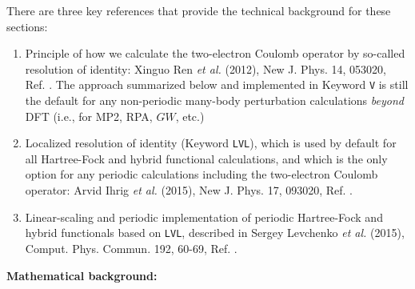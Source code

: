 There are three key references that provide the technical background
for these sections:
\begin{enumerate}
  \item Principle of how we calculate the two-electron Coulomb
    operator by so-called resolution of identity: Xinguo Ren \emph{et
    al.} (2012), New J. Phys. 14, 053020, Ref. \cite{Ren12a}. The
    approach summarized below and implemented in Keyword
     \texttt{V} is still the default for any
    non-periodic many-body perturbation calculations \emph{beyond} DFT
    (i.e., for MP2, RPA, $GW$, etc.)
  \item Localized resolution of identity (Keyword 
    \texttt{LVL}), which is used by default for all Hartree-Fock and
    hybrid functional calculations, and which is the only option for
    any periodic calculations including the two-electron Coulomb
    operator: Arvid Ihrig \emph{et al.} (2015), New J. Phys. 17,
    093020, Ref. \cite{Ihrig2015}.
  \item Linear-scaling and periodic implementation of periodic
    Hartree-Fock and hybrid functionals based on  
    \texttt{LVL}, described in Sergey Levchenko \emph{et al.} (2015),
    Comput. Phys. Commun. 192, 60-69, Ref. \cite{Levchenko2015}.
\end{enumerate}

\textbf{Mathematical background:}

